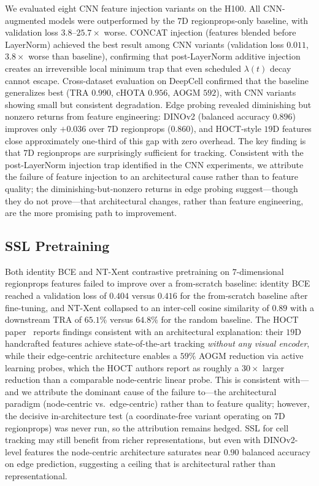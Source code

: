 We evaluated eight CNN feature injection variants on the H100. All CNN-augmented models were outperformed by the $7$D regionprops-only baseline, with validation loss $3.8$--$25.7\times$ worse. CONCAT injection (features blended before LayerNorm) achieved the best result among CNN variants (validation loss $0.011$, $3.8\times$ worse than baseline), confirming that post-LayerNorm additive injection creates an irreversible local minimum trap that even scheduled $\lambda(t)$ decay cannot escape. Cross-dataset evaluation on DeepCell confirmed that the baseline generalizes best (TRA $0.990$, cHOTA $0.956$, AOGM $592$), with CNN variants showing small but consistent degradation. Edge probing revealed diminishing but nonzero returns from feature engineering: DINOv2 (balanced accuracy $0.896$) improves only $+0.036$ over $7$D regionprops ($0.860$), and HOCT-style $19$D features close approximately one-third of this gap with zero overhead. The key finding is that $7$D regionprops are surprisingly sufficient for tracking. Consistent with the post-LayerNorm injection trap identified in the CNN experiments, we attribute the failure of feature injection to an architectural cause rather than to feature quality; the diminishing-but-nonzero returns in edge probing suggest---though they do not prove---that architectural changes, rather than feature engineering, are the more promising path to improvement.

\subsection{SSL Pretraining}

Both identity BCE and NT-Xent contrastive pretraining on $7$-dimensional regionprops features failed to improve over a from-scratch baseline: identity BCE reached a validation loss of $0.404$ versus $0.416$ for the from-scratch baseline after fine-tuning, and NT-Xent collapsed to an inter-cell cosine similarity of $0.89$ with a downstream TRA of $65.1\%$ versus $64.8\%$ for the random baseline. The HOCT paper~\cite{bragantini2026hoct} reports findings consistent with an architectural explanation: their $19$D handcrafted features achieve state-of-the-art tracking \emph{without any visual encoder}, while their edge-centric architecture enables a $59\%$ AOGM reduction via active learning probes, which the HOCT authors report as roughly a $30\times$ larger reduction than a comparable node-centric linear probe. This is consistent with---and we attribute the dominant cause of the failure to---the architectural paradigm (node-centric vs.\ edge-centric) rather than to feature quality; however, the decisive in-architecture test (a coordinate-free variant operating on $7$D regionprops) was never run, so the attribution remains hedged. SSL for cell tracking may still benefit from richer representations, but even with DINOv2-level features the node-centric architecture saturates near $0.90$ balanced accuracy on edge prediction, suggesting a ceiling that is architectural rather than representational.

